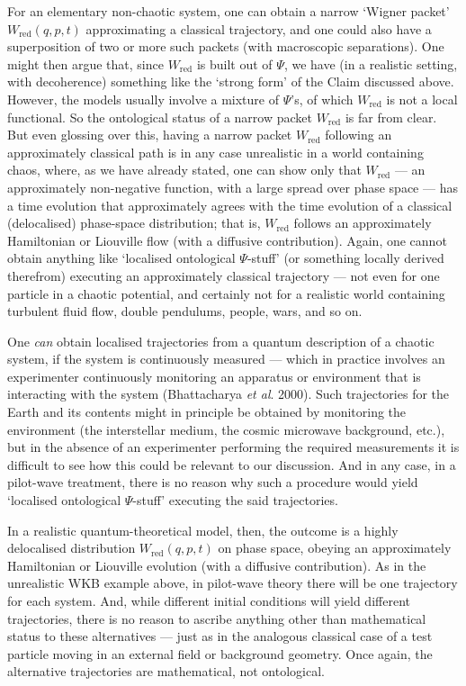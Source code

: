 \documentclass{article}%
\begin{document}
For an elementary non-chaotic system, one can obtain a narrow `Wigner packet'
$W_{\mathrm{red}}(q,p,t)$ approximating a classical trajectory, and one could
also have a superposition of two or more such packets (with macroscopic
separations). One might then argue that, since $W_{\mathrm{red}}$ is built out
of $\Psi$, we have (in a realistic setting, with decoherence) something like
the `strong form' of the Claim discussed above. However, the models usually
involve a mixture of $\Psi$'s, of which $W_{\mathrm{red}}$ is not a local
functional. So the ontological status of a narrow packet $W_{\mathrm{red}}$ is
far from clear. But even glossing over this, having a narrow packet
$W_{\mathrm{red}}$ following an approximately classical path is in any case
unrealistic in a world containing chaos, where, as we have already stated, one
can show only that $W_{\mathrm{red}}$ --- an approximately non-negative
function, with a large spread over phase space --- has a time evolution that
approximately agrees with the time evolution of a classical (delocalised)
phase-space distribution; that is, $W_{\mathrm{red}}$ follows an approximately
Hamiltonian or Liouville flow (with a diffusive contribution). Again, one
cannot obtain anything like `localised ontological $\Psi$-stuff' (or something
locally derived therefrom) executing an approximately classical trajectory ---
not even for one particle in a chaotic potential, and certainly not for a
realistic world containing turbulent fluid flow, double pendulums, people,
wars, and so on.

One \textit{can} obtain localised trajectories from a quantum description of a
chaotic system, if the system is continuously measured --- which in practice
involves an experimenter continuously monitoring an apparatus or environment
that is interacting with the system (Bhattacharya \textit{et al}. 2000). Such
trajectories for the Earth and its contents might in principle be obtained by
monitoring the environment (the interstellar medium, the cosmic microwave
background, etc.), but in the absence of an experimenter performing the
required measurements it is difficult to see how this could be relevant to our
discussion. And in any case, in a pilot-wave treatment, there is no reason why
such a procedure would yield `localised ontological $\Psi$-stuff' executing
the said trajectories.

In a realistic quantum-theoretical model, then, the outcome is a highly
delocalised distribution $W_{\mathrm{red}}(q,p,t)$ on phase space, obeying an
approximately Hamiltonian or Liouville evolution (with a diffusive
contribution). As in the unrealistic WKB example above, in pilot-wave theory
there will be one trajectory for each system. And, while different initial
conditions will yield different trajectories, there is no reason to ascribe
anything other than mathematical status to these alternatives --- just as in
the analogous classical case of a test particle moving in an external field or
background geometry. Once again, the alternative trajectories are
mathematical, not ontological.
\end{document}
